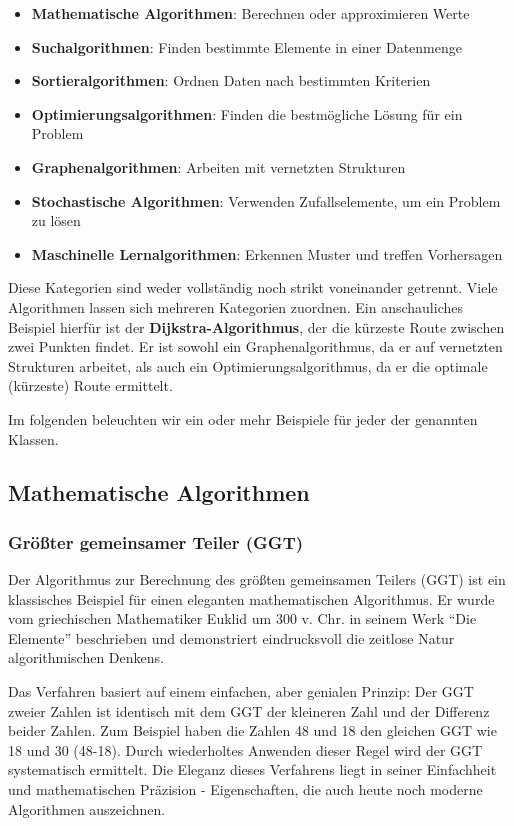 \documentclass[
  letterpaper,
  DIV=11]{scrreprt}
\begin{document}
\begin{itemize}
\item
  \textbf{Mathematische Algorithmen}: Berechnen oder approximieren Werte
\item
  \textbf{Suchalgorithmen}: Finden bestimmte Elemente in einer
  Datenmenge
\item
  \textbf{Sortieralgorithmen}: Ordnen Daten nach bestimmten Kriterien
\item
  \textbf{Optimierungsalgorithmen}: Finden die bestmögliche Lösung für
  ein Problem
\item
  \textbf{Graphenalgorithmen}: Arbeiten mit vernetzten Strukturen
\item
  \textbf{Stochastische Algorithmen}: Verwenden Zufallselemente, um ein
  Problem zu lösen
\item
  \textbf{Maschinelle Lernalgorithmen}: Erkennen Muster und treffen
  Vorhersagen
\end{itemize}

Diese Kategorien sind weder vollständig noch strikt voneinander
getrennt. Viele Algorithmen lassen sich mehreren Kategorien zuordnen.
Ein anschauliches Beispiel hierfür ist der
\textbf{Dijkstra-Algorithmus}, der die
kürzeste Route zwischen zwei Punkten findet. Er ist sowohl ein
Graphenalgorithmus, da er auf vernetzten Strukturen arbeitet, als auch
ein Optimierungsalgorithmus, da er die optimale (kürzeste) Route
ermittelt.

Im folgenden beleuchten wir ein oder mehr Beispiele für jeder der
genannten Klassen.

\subsection{Mathematische Algorithmen}\label{mathematische-algorithmen}

\subsubsection{Größter gemeinsamer Teiler
(GGT)}\label{gruxf6uxdfter-gemeinsamer-teiler-ggt}

Der Algorithmus zur Berechnung des größten gemeinsamen Teilers (GGT) ist
ein klassisches Beispiel für einen eleganten mathematischen Algorithmus.
Er wurde vom griechischen Mathematiker Euklid um 300 v. Chr. in seinem
Werk ``Die Elemente'' beschrieben und demonstriert eindrucksvoll die
zeitlose Natur algorithmischen Denkens.

Das Verfahren basiert auf einem einfachen, aber genialen Prinzip: Der
GGT zweier Zahlen ist identisch mit dem GGT der kleineren Zahl und der
Differenz beider Zahlen. Zum Beispiel haben die Zahlen 48 und 18 den
gleichen GGT wie 18 und 30 (48-18). Durch wiederholtes Anwenden dieser
Regel wird der GGT systematisch ermittelt. Die Eleganz dieses Verfahrens
liegt in seiner Einfachheit und mathematischen Präzision -
Eigenschaften, die auch heute noch moderne Algorithmen auszeichnen.
\end{document}
